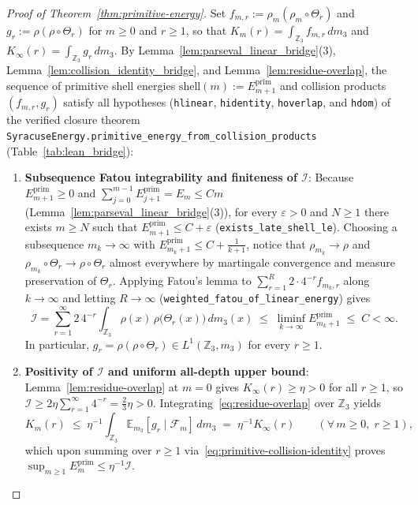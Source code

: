 \documentclass[11pt,a4paper]{article}
\numberwithin{equation}{section}
\theoremstyle{definition}
\theoremstyle{remark}
\newcommand{\Z}{\mathbb{Z}}
\newcommand{\E}{\mathbb{E}}
\newcommand{\cF}{\mathcal{F}}
\newcommand{\cI}{\mathcal{I}}
\newcommand{\prim}{\mathrm{prim}}
\begin{document}
\begin{proof}[Proof of Theorem~\ref{thm:primitive-energy}]
Set $f_{m, r} := \rho_m(\rho_m \circ \Theta_r)$ and $g_r := \rho(\rho \circ \Theta_r)$ for $m \ge 0$ and $r \ge 1$, so that $K_m(r) = \int_{\Z_3} f_{m, r}\,dm_3$ and $K_\infty(r) = \int_{\Z_3} g_r\,dm_3$. By Lemma~\ref{lem:parseval_linear_bridge}(3), Lemma~\ref{lem:collision_identity_bridge}, and Lemma~\ref{lem:residue-overlap}, the sequence of primitive shell energies $\mathrm{shell}(m) := E_{m+1}^{\prim}$ and collision products $(f_{m, r}, g_r)$ satisfy all hypotheses (\texttt{hlinear}, \texttt{hidentity}, \texttt{hoverlap}, and \texttt{hdom}) of the verified closure theorem \texttt{SyracuseEnergy.primitive\_energy\_from\_collision\_products} (Table~\ref{tab:lean_bridge}):
\begin{enumerate}[label=(\arabic*),topsep=2pt,itemsep=2pt]
\item \textbf{Subsequence Fatou integrability and finiteness of $\cI$}: Because $E_{m+1}^{\prim} \ge 0$ and $\sum_{j=0}^{m-1} E_{j+1}^{\prim} = E_m \le C m$ (Lemma~\ref{lem:parseval_linear_bridge}(3)), for every $\varepsilon > 0$ and $N \ge 1$ there exists $m \ge N$ such that $E_{m+1}^{\prim} \le C + \varepsilon$ (\texttt{exists\_late\_shell\_le}). Choosing a subsequence $m_k \to \infty$ with $E_{m_k + 1}^{\prim} \le C + \frac{1}{k+1}$, notice that $\rho_{m_k} \to \rho$ and $\rho_{m_k} \circ \Theta_r \to \rho \circ \Theta_r$ almost everywhere by martingale convergence and measure preservation of $\Theta_r$. Applying Fatou's lemma to $\sum_{r=1}^R 2\cdot 4^{-r} f_{m_k, r}$ along $k \to \infty$ and letting $R \to \infty$ (\texttt{weighted\_fatou\_of\_linear\_energy}) gives
\[
 \cI = \sum_{r=1}^\infty 2\,4^{-r} \int_{\Z_3} \rho(x)\,\rho\bigl(\Theta_r(x)\bigr)\,dm_3(x) \;\le\; \liminf_{k \to \infty} E_{m_k + 1}^{\prim} \;\le\; C < \infty.
\]
In particular, $g_r = \rho(\rho \circ \Theta_r) \in L^1(\Z_3, m_3)$ for every $r \ge 1$.
\item \textbf{Positivity of $\cI$ and uniform all-depth upper bound}: Lemma~\ref{lem:residue-overlap} at $m = 0$ gives $K_\infty(r) \ge \eta > 0$ for all $r \ge 1$, so $\cI \ge 2\eta \sum_{r=1}^\infty 4^{-r} = \frac{2}{3}\eta > 0$. Integrating~\eqref{eq:residue-overlap} over $\Z_3$ yields
\begin{equation}\label{eq:Km_dominated}
 K_m(r) \;\le\; \eta^{-1}\int_{\Z_3} \E_{m_3}[g_r \mid \cF_m]\,dm_3 \;=\; \eta^{-1} K_\infty(r) \qquad (\forall\, m \ge 0,\; r \ge 1),
\end{equation}
which upon summing over $r \ge 1$ via~\eqref{eq:primitive-collision-identity} proves $\sup_{m \ge 1} E_m^{\prim} \le \eta^{-1}\cI$.

\end{enumerate}
\end{proof}
\end{document}
